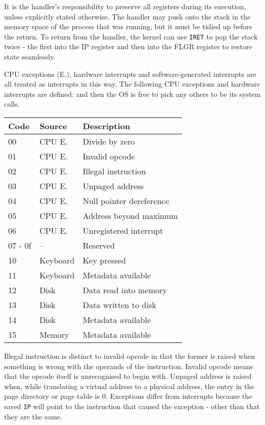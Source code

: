\documentclass[12pt,a4paper]{report}
\begin{document}
It is the handler's responsibility to preserve all registers during its execution, unless explicitly stated otherwise. The handler may push onto the stack in the memory space of the process that was running, but it must be tidied up before the return. To return from the handler, the kernel can use \texttt{IRET} to pop the stack twice - the first into the IP register and then into the FLGR register to restore state seamlessly.

CPU exceptions (E.), hardware interrupts and software-generated interrupts are all treated as interrupts in this way. The following CPU exceptions and hardware interrupts are defined: and then the OS is free to pick any others to be its system calls.

\begin{center}
  \begin{tabular}{|l|l|l|}
    \hline
    Code    & Source   & Description              \\
    \hline
    00      & CPU E.   & Divide by zero           \\
    01      & CPU E.   & Invalid opcode           \\
    02      & CPU E.   & Illegal instruction      \\
    03      & CPU E.   & Unpaged address          \\
    04      & CPU E.   & Null pointer dereference \\
    05      & CPU E.   & Address beyond maximum   \\
    06      & CPU E.   & Unregistered interrupt   \\
    07 - 0f & --       & Reserved                 \\
    10      & Keyboard & Key pressed              \\
    11      & Keyboard & Metadata available       \\
    12      & Disk     & Data read into memory    \\
    13      & Disk     & Data written to disk     \\
    14      & Disk     & Metadata available       \\
    15      & Memory   & Metadata available       \\
    \hline
  \end{tabular}
\end{center}

Illegal instruction is distinct to invalid opcode in that the former is raised when something is wrong with the operands of the instruction. Invalid opcode means that the opcode itself is unrecognised to begin with. Unpaged address is raised when, while translating a virtual address to a physical address, the entry in the page directory or page table is 0. Exceptions differ from interrupts because the saved \texttt{IP} will point to the instruction that caused the exception - other than that they are the same.
\end{document}
